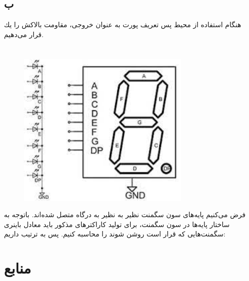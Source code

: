 \documentclass{article}
\begin{document}
\subsection{ب}
هنگام استفاده از محیط  پس تعریف پورت به عنوان خروجی، مقاومت بالاکش را یك قرار می‌دهیم.
\lr{}

\section{}

\begin{figure}[H]
    \centering
    \includegraphics[width=0.75\textwidth]{figures/3.a.png}
    \caption
	{}
    \label{fig:fig1}
\end{figure}

 فرض می‌کنیم پایه‌های سون سگمنت نظیر به نظیر به درگاه  متصل
شده‌اند. باتوجه به ساختار پایه‌ها در سون سگمنت، برای تولید کاراکترهای مذکور باید معادل باینری سگمنت‌هایی که قرار است روشن
شوند را محاسبه کنیم. پس به ترتیب داریم:
\lr{}


\section*{منابع}
\renewcommand{\section}[2]{}%
\begin{thebibliography}{99} %


\begin{LTRitems}

\resetlatinfont


\end{LTRitems}

\end{thebibliography}
\end{document}
